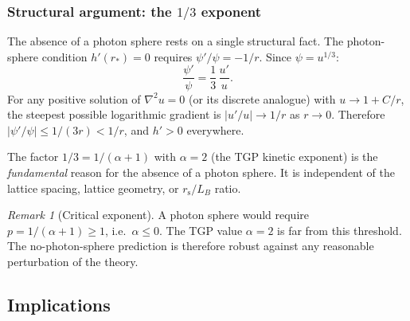 \documentclass[11pt,a4paper]{article}
\theoremstyle{definition}
\theoremstyle{remark}
\newtheorem{remark}[theorem]{Remark}
\newcommand{\rs}{r_{\mathrm{s}}}
\begin{document}
\subsubsection{Structural argument: the $1/3$ exponent}

The absence of a photon sphere rests on a single structural fact.
The photon-sphere condition $h'(r_{*}) = 0$ requires
$\psi'/\psi = -1/r$.  Since $\psi = u^{1/3}$:
\begin{equation}\label{eq:one-third}
  \frac{\psi'}{\psi} = \frac{1}{3}\,\frac{u'}{u}.
\end{equation}
For any positive solution of $\nabla^{2} u = 0$ (or its discrete
analogue) with $u \to 1 + C/r$, the steepest possible logarithmic
gradient is $|u'/u| \to 1/r$ as $r \to 0$.  Therefore
$|\psi'/\psi| \leq 1/(3r) < 1/r$, and $h' > 0$ everywhere.

The factor $1/3 = 1/(\alpha+1)$ with $\alpha = 2$ (the TGP kinetic
exponent) is the \emph{fundamental} reason for the absence of a photon
sphere.  It is independent of the lattice spacing, lattice geometry, or
$\rs/L_{B}$ ratio.

\begin{remark}[Critical exponent]\label{rem:critical-alpha}
A photon sphere would require $p = 1/(\alpha+1) \geq 1$,
i.e.\ $\alpha \leq 0$.  The TGP value $\alpha = 2$ is far from this
threshold.  The no-photon-sphere prediction is therefore robust against
any reasonable perturbation of the theory.
\end{remark}

\subsection{Implications}\label{ssec:implications}
\end{document}
